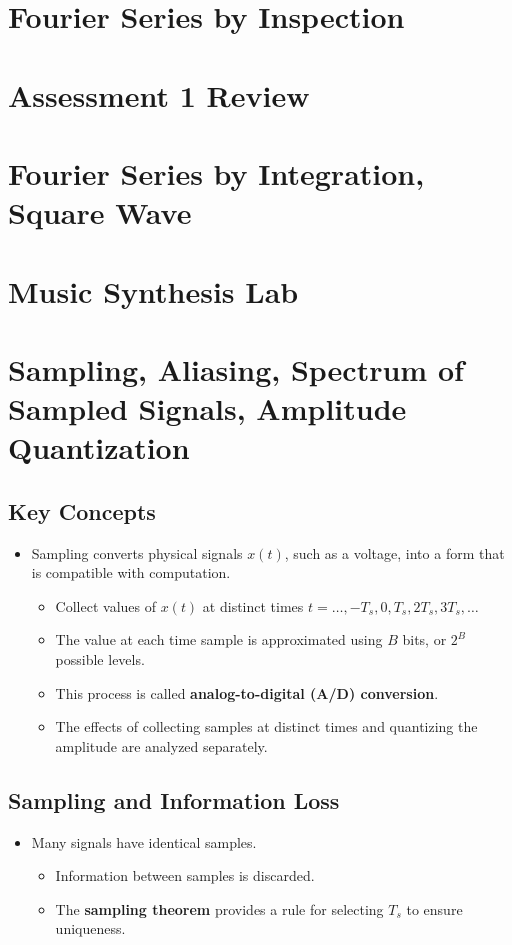\documentclass[12pt, letterpaper]{article}
\begin{document}
\newpage
\section{Fourier Series by Inspection}

\newpage
\section{Assessment 1 Review}

\newpage
\section{Fourier Series by Integration, Square Wave}

\newpage
\section{Music Synthesis Lab}

\newpage
\section{Sampling, Aliasing, Spectrum of Sampled Signals, Amplitude Quantization}

\subsection{Key Concepts}
\begin{itemize}
    \item Sampling converts physical signals \( x(t) \), such as a voltage, into a form that is compatible with computation.
    \begin{itemize}
        \item Collect values of \( x(t) \) at distinct times \( t = \dots, -T_s, 0, T_s, 2T_s, 3T_s, \dots \)
        \item The value at each time sample is approximated using \( B \) bits, or \( 2^B \) possible levels.
        \item This process is called \textbf{analog-to-digital (A/D) conversion}.
        \item The effects of collecting samples at distinct times and quantizing the amplitude are analyzed separately.
    \end{itemize}
\end{itemize}

\subsection{Sampling and Information Loss}
\begin{itemize}
    \item Many signals have identical samples.
    \begin{itemize}
        \item Information between samples is discarded.
        \item The \textbf{sampling theorem} provides a rule for selecting \( T_s \) to ensure uniqueness.
    \end{itemize}
\end{itemize}
\end{document}
